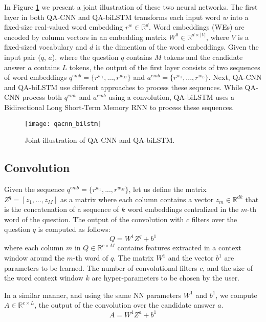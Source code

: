 \documentclass{article}
\begin{document}
In Figure \ref{qacnn}
we present a joint illustration of these two neural networks.
The first layer in both QA-CNN and QA-biLSTM transforms each input word $w$ into a fixed-size real-valued word embedding $r^{w} \in \mathbb{R}^{d}$.
Word embeddings (WEs) are encoded by column vectors in an embedding matrix $W^{0}\in\mathbb{R}^{d\times|V|}$,
where $V$ is a fixed-sized vocabulary
and $d$ is the dimention of the word embeddings.
Given the input pair ($q$, $a$),
where the question $q$ contains $M$ tokens and the candidate answer $a$ contains $L$ tokens,
the output of the first layer consists of two sequences of word embeddings $q^{emb}=\{r^{w_{1}}, ..., r^{w_{M}}\}$ and $a^{emb}=\{r^{w_{1}}, ..., r^{w_{L}}\}$.
Next,
QA-CNN and QA-biLSTM use different approaches to process these sequences.
While QA-CNN process both $q^{emb}$ and $a^{emb}$ using a convolution,
QA-biLSTM uses a Bidirectional Long Short-Term Memory RNN \cite{lstm1997} to process these sequences.

\begin{figure}[ht]
\vskip 0.2in
\begin{center}
\centerline{\texttt{[image: qacnn\_bilstm]}}
\caption{Joint illustration of QA-CNN and QA-biLSTM.}
\label{qacnn}
\end{center}
\vskip -0.2in
\end{figure}

\subsection{Convolution}
Given the sequence $q^{emb}=\{r^{w_{1}}, ..., r^{w_{M}}\}$,
let us define the matrix $Z^q = [z_1,...,z_M]$ as a matrix where each column contains a vector $z_m\in\mathbb{R}^{dk}$ that is the concatenation of a sequence of $k$ word embeddings centralized in the $m$-th word of the question.
The output of the convolution with $c$ filters over the question $q$ is computed as follows:
\begin{equation} \label{conv_layer_apcnn_Q}
Q = W^{1}Z^q+ b^{1}
\end{equation}
where each column $m$ in $Q \in \mathbb{R}^{c \times M}$ contains features extracted in a context window around the $m$-th word of $q$.
The matrix $W^{1}$ and the vector $b^{1}$ are parameters to be learned.
The number of convolutional filters $c$,
and the size of the word context window $k$
are hyper-parameters to be chosen by the user.

In a similar manner,
and using the same NN parameters $W^{1}$ and $b^{1}$,
we compute $A \in \mathbb{R}^{c \times L}$, 
the output of the convolution over the candidate answer $a$.
\begin{equation} \label{conv_layer_apcnn_A}
A = W^{1}Z^a+ b^{1}
\end{equation}
\end{document}
